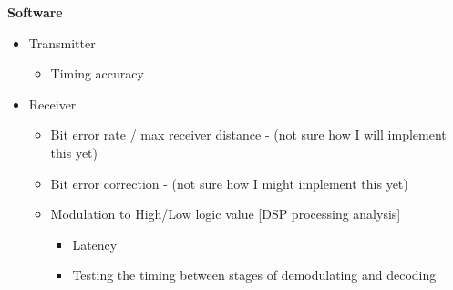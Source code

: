 \textbf{Software}
\begin{itemize}
	
	\item Transmitter
	\begin{itemize}
		\item Timing accuracy
	\end{itemize}

	
	\item Receiver
	\begin{itemize}
		\item Bit error rate / max receiver distance - (not sure how I will implement this yet)
		\item Bit error correction - (not sure how I might implement this yet)
		\item Modulation to High/Low logic value [DSP processing analysis]
		\begin{itemize}
			\item Latency
			\item Testing the timing between stages of demodulating and decoding
		\end{itemize}
	\end{itemize}

\end{itemize}









